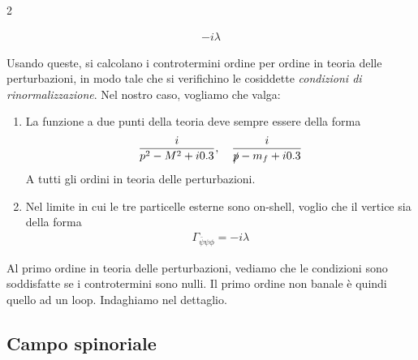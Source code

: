 \documentclass[11pt]{report}
\begin{document}
\begin{multicols}{2}
    \begin{center}
    \end{center}
    \columnbreak
    \begin{align}
        -i\lambda
    \end{align}
\end{multicols}

Usando queste, si calcolano i controtermini ordine per ordine in teoria delle perturbazioni, in modo tale che si verifichino le cosiddette \emph{condizioni di rinormalizzazione}. Nel nostro caso, vogliamo che valga: 

\begin{enumerate}
    \item La funzione a due punti della teoria deve sempre essere della forma 
    \begin{align}
        \frac{i}{p^2 - M^2 + i0.3}, \quad \frac{i}{\slashed{p} - m_f +i0.3}
    \end{align}
    A tutti gli ordini in teoria delle perturbazioni. 
    \item Nel limite in cui le tre particelle esterne sono on-shell, voglio che il vertice sia della forma 
    \begin{align}
        \Gamma_{\bar{\psi}\psi\phi} = -i\lambda
    \end{align}
\end{enumerate}

Al primo ordine in teoria delle perturbazioni, vediamo che le condizioni sono soddisfatte se i controtermini sono nulli. Il primo ordine non banale è quindi quello ad un loop. Indaghiamo nel dettaglio. 

\subsection{Campo spinoriale}
\end{document}
